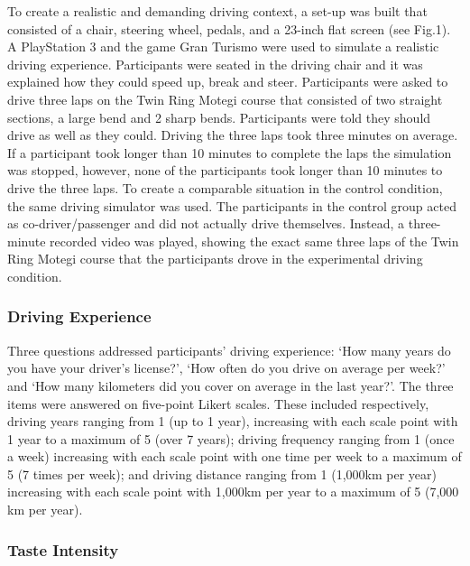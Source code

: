\documentclass[authordate, empirical, issue]{jote-new-article}
\begin{document}
To create a realistic and demanding driving context, a set-up was built that consisted of a chair, steering wheel, pedals, and a 23-inch flat screen (see Fig.1). A PlayStation 3 and the game Gran Turismo \parencites{Yamauchi2013} were used to simulate a realistic driving experience. Participants were seated in the driving chair and it was explained how they could speed up, break and steer. Participants were asked to drive three laps on the Twin Ring Motegi course that consisted of two straight sections, a large bend and 2 sharp bends. Participants were told they should drive as well as they could. Driving the three laps took three minutes on average. If a participant took longer than 10 minutes to complete the laps the simulation was stopped, however, none of the participants took longer than 10 minutes to drive the three laps. To create a comparable situation in the control condition, the same driving simulator was used. The participants in the control group acted as co-driver/passenger and did not actually drive themselves. Instead, a three-minute recorded video was played, showing the exact same three laps of the Twin Ring Motegi course that the participants drove in the experimental driving condition.











\subsubsection{Driving Experience}



Three questions addressed participants’ driving experience: ‘How many years do you have your driver’s license?’, ‘How often do you drive on average per week?’ and ‘How many kilometers did you cover on average in the last year?’. The three items were answered on five-point Likert scales. These included respectively, driving years ranging from 1 (up to 1 year), increasing with each scale point with 1 year to a maximum of 5 (over 7 years); driving frequency ranging from 1 (once a week) increasing with each scale point with one time per week to a maximum of 5 (7 times per week); and driving distance ranging from 1 (1,000km per year) increasing with each scale point with 1,000km per year to a maximum of 5 (7,000 km per year).



\subsubsection{Taste Intensity}
\end{document}
